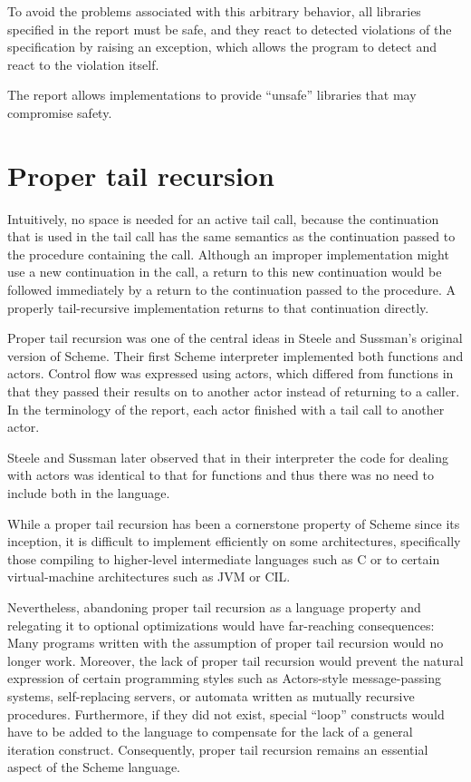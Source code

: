 \documentclass[twoside,twocolumn]{algol60}
\begin{document}
To avoid the problems associated with this arbitrary behavior, all
libraries specified in the report must be safe, and they react to
detected violations of the specification by raising
an exception, which allows the program to detect and react
to the violation itself.

The report allows implementations to provide ``unsafe'' libraries that
may compromise safety.

\section{Proper tail recursion}

Intuitively, no space is needed for an active tail call, because the
continuation that is used in the tail call has the same semantics as the
continuation passed to the procedure containing the call.  Although an improper
implementation might use a new continuation in the call, a return
to this new continuation would be followed immediately by a return
to the continuation passed to the procedure.  A properly tail-recursive
implementation returns to that continuation directly.

Proper tail recursion was one of the central ideas in Steele and
Sussman's original version of Scheme.  Their first Scheme interpreter
implemented both functions and actors.  Control flow was expressed using
actors, which differed from functions in that they passed their results
on to another actor instead of returning to a caller.  In the terminology
of the report, each actor finished with a tail call to another actor.

Steele and Sussman later observed that in their interpreter the code
for dealing with actors was identical to that for functions and thus
there was no need to include both in the language.

While a proper tail recursion has been a cornerstone property of
Scheme since its inception, it is difficult to implement efficiently
on some architectures, specifically those compiling to higher-level
intermediate languages such as C or to certain virtual-machine
architectures such as JVM or CIL.

Nevertheless, abandoning proper tail recursion as a language property
and relegating it to optional optimizations would have far-reaching
consequences: Many programs written with the assumption of proper tail
recursion would no longer work.  Moreover, the lack of proper tail
recursion would prevent the natural expression of certain programming
styles such as Actors-style message-passing systems, self-replacing
servers, or automata written as mutually recursive procedures.
Furthermore, if they did not exist, special ``loop'' constructs would
have to be added to the language to compensate for the lack of a general
iteration construct.  Consequently, proper tail recursion remains an
essential aspect of the Scheme language.
\end{document}

